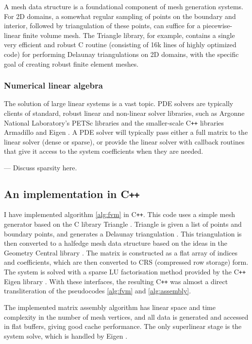 A mesh data structure is a foundational component of mesh generation systems. For 2D domains, a somewhat regular sampling of points on the boundary
and interior, followed by triangulation of these points, can suffice for a piecewise-linear finite volume mesh.
The Triangle \cite{triangle} library, for example, contains a single very efficient and robust C routine (consisting of 16k lines of highly optimized code)
for performing Delaunay triangulations \cite{orourke}
on 2D domains,
with the specific goal of creating robust finite element meshes.

\subsubsection{Numerical linear algebra}
The solution of large linear systems is a vast topic. PDE solvers are typically clients
of standard, robust linear and non-linear solver libraries, such as Argonne National Laboratory's PETSc libraries \cite{petsc}
and the smaller-scale C\texttt{++} libraries Armadillo \cite{armadillo} and Eigen \cite{eigen}.
A PDE solver will typically pass either a full matrix to the linear solver (dense or sparse),
or provide the linear solver with callback routines that give it access to the system coefficients when they are needed.

--- Discuss sparsity here.

\subsection{An implementation in C\texttt{++}}
I have implemented algorithm \ref{alg:fvm} in C\texttt{++}.
This code uses a simple mesh generator based on the C library Triangle \cite{triangle}. Triangle is given a list of points
and boundary points, and generates a Delaunay triangulation \cite{orourke}. This triangulation is then converted to a halfedge mesh data structure
based on the ideas in the Geometry Central library \cite{geometry_central}.
The matrix is constructed as a flat array of indices and coefficients, which are then converted to CRS (compressed row storage) form.
The system is solved with a sparse LU factorisation method provided by the C\texttt{++} Eigen library \cite{eigen}.
With these interfaces, the resulting C\texttt{++} was almost a direct transliteration of the pseudocodes \ref{alg:fvm} and \ref{alg:assembly}.

The implemented matrix assembly algorithm has linear space and time complexity in the number of mesh vertices,
and all data is generated and accessed in flat buffers, giving good cache performance.
The only superlinear stage is the system solve, which is handled by Eigen \cite{eigen}.


